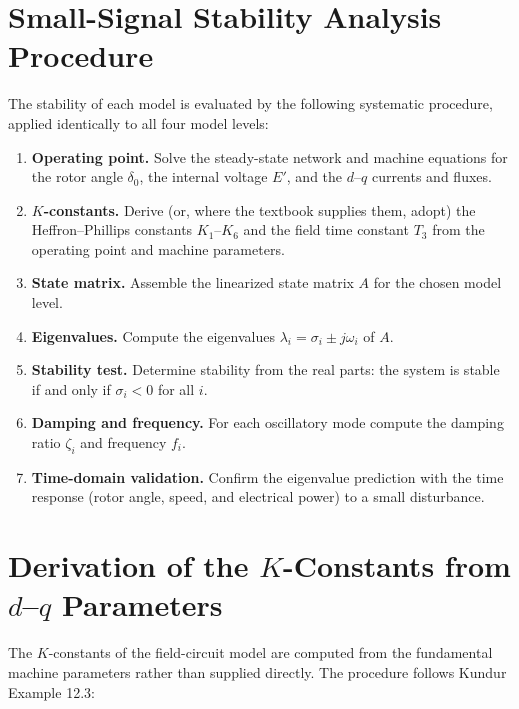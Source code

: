 \documentclass[12pt,a4paper]{article}
\begin{document}
\section{Small-Signal Stability Analysis Procedure}
\label{sec:procedure}

The stability of each model is evaluated by the following systematic procedure,
applied identically to all four model levels:

\begin{enumerate}
    \item \textbf{Operating point.} Solve the steady-state network and machine
          equations for the rotor angle $\delta_0$, the internal voltage $E'$,
          and the $d$--$q$ currents and fluxes.
    \item \textbf{$K$-constants.} Derive (or, where the textbook supplies them,
          adopt) the Heffron--Phillips constants $K_1$--$K_6$ and the field time
          constant $T_3$ from the operating point and machine parameters.
    \item \textbf{State matrix.} Assemble the linearized state matrix $A$ for
          the chosen model level.
    \item \textbf{Eigenvalues.} Compute the eigenvalues $\lambda_i = \sigma_i \pm
          j\omega_i$ of $A$.
    \item \textbf{Stability test.} Determine stability from the real parts: the
          system is stable if and only if $\sigma_i < 0$ for all $i$.
    \item \textbf{Damping and frequency.} For each oscillatory mode compute the
          damping ratio $\zeta_i$ and frequency $f_i$.
    \item \textbf{Time-domain validation.} Confirm the eigenvalue prediction
          with the time response (rotor angle, speed, and electrical power) to a
          small disturbance.
\end{enumerate}

\section{Derivation of the $K$-Constants from $d$--$q$ Parameters}
\label{sec:kderiv}

The $K$-constants of the field-circuit model are computed from the fundamental
machine parameters rather than supplied directly. The procedure follows Kundur
Example 12.3:
\end{document}
